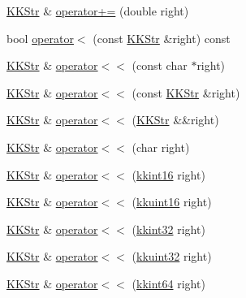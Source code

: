 \begin{DoxyCompactItemize}
\hyperlink{class_k_k_b_1_1_k_k_str}{K\+K\+Str} \& \hyperlink{class_k_k_b_1_1_k_k_str_ac98d650032ddd30a4bd7fffb1c69299c}{operator+=} (double right)
\item 
bool \hyperlink{class_k_k_b_1_1_k_k_str_a22e18551a7c2596e8760cef096003781}{operator$<$} (const \hyperlink{class_k_k_b_1_1_k_k_str}{K\+K\+Str} \&right) const 
\item 
\hyperlink{class_k_k_b_1_1_k_k_str}{K\+K\+Str} \& \hyperlink{class_k_k_b_1_1_k_k_str_a23fd4688145ca978e8f2fe5314ed38fc}{operator$<$$<$} (const char $\ast$right)
\item 
\hyperlink{class_k_k_b_1_1_k_k_str}{K\+K\+Str} \& \hyperlink{class_k_k_b_1_1_k_k_str_a656a8ef78af436a7d471e0915d5481ee}{operator$<$$<$} (const \hyperlink{class_k_k_b_1_1_k_k_str}{K\+K\+Str} \&right)
\item 
\hyperlink{class_k_k_b_1_1_k_k_str}{K\+K\+Str} \& \hyperlink{class_k_k_b_1_1_k_k_str_a4ff41d75666162eac28f628c1be2f03d}{operator$<$$<$} (\hyperlink{class_k_k_b_1_1_k_k_str}{K\+K\+Str} \&\&right)
\item 
\hyperlink{class_k_k_b_1_1_k_k_str}{K\+K\+Str} \& \hyperlink{class_k_k_b_1_1_k_k_str_a5d47c365d133be36418a382afbf5343e}{operator$<$$<$} (char right)
\item 
\hyperlink{class_k_k_b_1_1_k_k_str}{K\+K\+Str} \& \hyperlink{class_k_k_b_1_1_k_k_str_afcc20d0ecc5b51d763a9339ae6ae2e80}{operator$<$$<$} (\hyperlink{namespace_k_k_b_a93809780ee294124dda4c23069f41248}{kkint16} right)
\item 
\hyperlink{class_k_k_b_1_1_k_k_str}{K\+K\+Str} \& \hyperlink{class_k_k_b_1_1_k_k_str_a956658811b59a6b98596e29d6a385184}{operator$<$$<$} (\hyperlink{namespace_k_k_b_aa8c7d4d30381c8a0b6fce68974a9c8a9}{kkuint16} right)
\item 
\hyperlink{class_k_k_b_1_1_k_k_str}{K\+K\+Str} \& \hyperlink{class_k_k_b_1_1_k_k_str_a1265f436fc37d14f3aca4403f3f1bae3}{operator$<$$<$} (\hyperlink{namespace_k_k_b_a8fa4952cc84fda1de4bec1fbdd8d5b1b}{kkint32} right)
\item 
\hyperlink{class_k_k_b_1_1_k_k_str}{K\+K\+Str} \& \hyperlink{class_k_k_b_1_1_k_k_str_ac3ba6ee727745f552f03e3100e590355}{operator$<$$<$} (\hyperlink{namespace_k_k_b_af8d832f05c54994a1cce25bd5743e19a}{kkuint32} right)
\item 
\hyperlink{class_k_k_b_1_1_k_k_str}{K\+K\+Str} \& \hyperlink{class_k_k_b_1_1_k_k_str_af4fb86f16781fee4311db8f4b9b2c595}{operator$<$$<$} (\hyperlink{namespace_k_k_b_aa3486b1c5ea9162b3b020c69f72826eb}{kkint64} right)
\item 

\end{DoxyCompactItemize}
